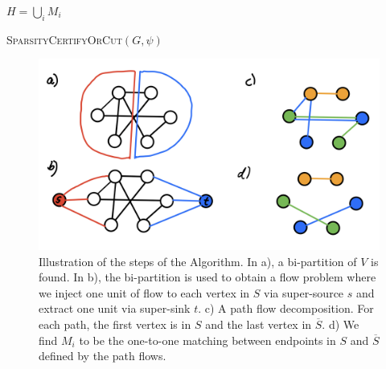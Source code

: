 \begin{algorithm}[H]
    \Return $H = \bigcup_{i} M_i$
  \caption{\textsc{SparsityCertifyOrCut}$(G, \psi)$}
  \label{algo:cutMatchingGame}
\end{algorithm}

\begin{figure}[!ht]
    \centering
    \includegraphics[scale=0.2]{./fig/AlgorithmProcessing_lectureCutMatching.jpeg}
    \caption{Illustration of the steps of the Algorithm. In a), a bi-partition of $V$ is found. In b), the bi-partition is used to obtain a flow problem where we inject one unit of flow to each vertex in $S$ via super-source $s$ and extract one unit via super-sink $t$. c) A path flow decomposition. For each path, the first vertex is in $S$ and the last vertex in $\overline{S}$. d) We find $M_i$ to be the one-to-one matching between endpoints in $S$ and $\overline{S}$ defined by the path flows.}
\end{figure}

